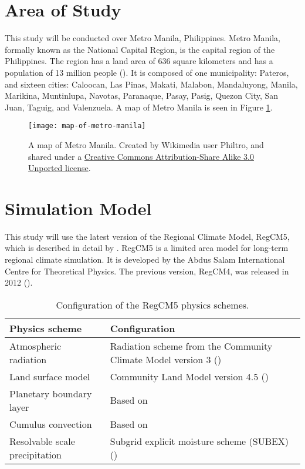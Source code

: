 \section{Area of Study}
	This study will be conducted over Metro Manila, Philippines.
	Metro Manila, formally known as the National Capital Region, is the capital region of the Philippines.
	The region has a land area of 636 square kilometers	and has a population of 13 million people (\cite{PSA2021}).
	It is composed of one municipality: Pateros, and sixteen cities:
		Caloocan,
		Las Pinas,
		Makati,
		Malabon,
		Mandaluyong,
		Manila,
		Marikina,
		Muntinlupa,
		Navotas,
		Paranaque,
		Pasay,
		Pasig,
		Quezon City,
		San Juan,
		Taguig, and
		Valenzuela.
	A map of Metro Manila is seen in Figure \ref{fig:map-of-metro-manila}.
	
	\begin{figure}
		\centering
		\texttt{[image: map-of-metro-manila]}
		\caption{
			A map of Metro Manila.
			Created by Wikimedia user Philtro, and shared under a
			\href{https://creativecommons.org/licenses/by-sa/3.0/deed.en}{Creative Commons Attribution-Share Alike 3.0 Unported license}.
		}
		\label{fig:map-of-metro-manila}
	\end{figure}	
		
\section{Simulation Model}
	This study will use the latest version of the Regional Climate Model, RegCM5, which is described in detail by \textcite{Giorgi2023}.
	RegCM5 is a limited area model for long-term regional climate simulation.
	It is developed by the Abdus Salam International Centre for Theoretical Physics.
	The previous version, RegCM4, was released in 2012 (\cite{Giorgi2012}).
	
	\begin{table}	
		\caption{Configuration of the RegCM5 physics schemes.}
		\label{tab:physics-schemes}
		\centering
		\begin{tabular}{p{2 in} p{2.75 in}}
			\hline \hline
			Physics scheme & Configuration\\
			\hline
			Atmospheric radiation & Radiation scheme from the Community Climate Model version 3 (\cite{Kiehl1996}) \\
			Land surface model & Community Land Model version 4.5 (\cite{Oleson2013})\\
			Planetary boundary layer & Based on \textcite{Holtslag1990}\\
			Cumulus convection & Based on \textcite{Emanuel1991}\\
			Resolvable scale precipitation & Subgrid explicit moisture scheme (SUBEX) (\cite{Pal2000})\\
			\hline
		\end{tabular}		
	\end{table}

